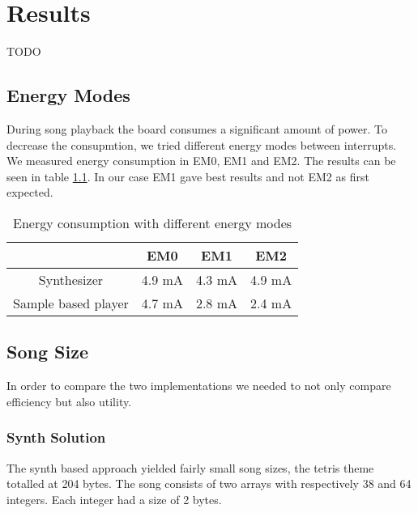 \chapter{Results}
TODO

\section{Energy Modes}
\label{sec:energyModeResults}
During song playback the board consumes a significant amount of power. To decrease the consupmtion, we tried different energy modes between interrupts. We measured energy consumption in EM0, EM1 and EM2. The results can be seen in table \ref{tab:benchmarkEnergyModes}. In our case EM1 gave best results and not EM2 as first expected.

\begin{table}[ht]
	\begin{center}
	\begin{tabular}{ |c|c|c|c| }
	  \hline
	  & EM0 & EM1 & EM2 \\
	  \hline
	  Synthesizer & 4.9 mA & 4.3 mA & 4.9 mA \\
	  \hline
	  Sample based player & 4.7 mA & 2.8 mA & 2.4 mA \\
	  \hline

	\end{tabular}
	\caption{Energy consumption with different energy modes}
	\label{tab:benchmarkEnergyModes}
	\end{center}
\end{table}

\section{Song Size}
In order to compare the two implementations we needed to not only compare efficiency but also utility. 

\subsection{Synth Solution}
The synth based approach yielded fairly small song sizes, the tetris theme totalled at 204 bytes. The song consists of two arrays with respectively 38 and 64 integers. Each integer had a size of 2 bytes.

